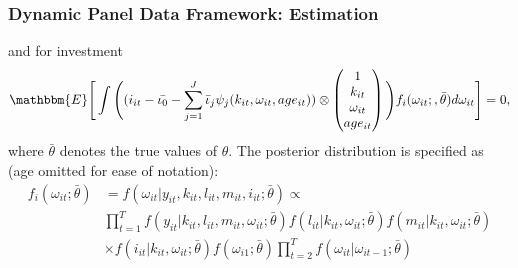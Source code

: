 \documentclass{beamer}
\begin{document}

\begin{frame}
\frametitle{Dynamic Panel Data Framework: Estimation}
and for investment
\begin{equation}\label{iimc}
\begin{split}
\mathbbm{E}\Bigg[\int\Bigg((i_{it}-\bar{\iota_{0}}-\sum_{j=1}^{J}\bar{\iota}_{j}\psi_{j}(k_{it}, \omega_{it}, age_{it}))\otimes
\begin{pmatrix}
1 \\
k_{it} \\
\omega_{it}\\
age_{it}
\end{pmatrix}
\Bigg)f_{i}(\omega_{it};,\bar{\theta})d\omega_{it}\Bigg]=0,
\end{split}
\end{equation}
where $\bar{\theta}$ denotes the true values of $\theta$. The posterior distribution is specified as (age omitted for ease of notation):
\begin{equation}\label{posterior}
\begin{split}
f_{i}(\omega_{it};\bar{\theta})&=f(\omega_{it}|y_{it}, k_{it}, l_{it}, m_{it}, i_{it}; \bar{\theta}) \propto\\
&\prod_{t=1}^{T}f(y_{it}|k_{it}, l_{it}, m_{it}, \omega_{it};\bar{\theta})f(l_{it}|k_{it}, \omega_{it};\bar{\theta})f(m_{it}|k_{it}, \omega_{it};\bar{\theta}) \\
&\times f(i_{it}|k_{it}, \omega_{it};\bar{\theta})f(\omega_{i1};\bar{\theta})\prod_{t=2}^{T}f(\omega_{it}|\omega_{it-1};\bar{\theta})
\end{split}
\end{equation}
\end{frame}

\end{document}
